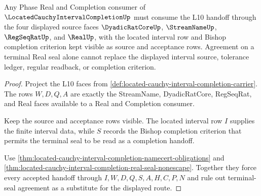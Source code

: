 \begin{theorem}
\label{thm:located-cauchy-interval-completion-l10-handoff}
Any Phase Real and Completion consumer of $\LocatedCauchyIntervalCompletionUp$ must consume the L10 handoff through the four displayed source faces $\DyadicRatCoreUp$, $\StreamNameUp$, $\RegSeqRatUp$, and $\RealUp$, with the located interval row and Bishop completion criterion kept visible as source and acceptance rows. Agreement on a terminal Real seal alone cannot replace the displayed interval source, tolerance ledger, regular readback, or completion criterion.
\end{theorem}
\begin{proof}
Project the L10 faces from \autoref{def:located-cauchy-interval-completion-carrier}. The rows $W,D,Q,A$ are exactly the StreamName, DyadicRatCore, RegSeqRat, and Real faces available to a Real and Completion consumer.

Keep the source and acceptance rows visible. The located interval row $I$ supplies the finite interval data, while $S$ records the Bishop completion criterion that permits the terminal seal to be read as a completion handoff.

Use \autoref{thm:located-cauchy-interval-completion-namecert-obligations} and \autoref{thm:located-cauchy-interval-completion-real-seal-nonescape}. Together they force every accepted handoff through $I,W,D,Q,S,A,H,C,P,N$ and rule out terminal-seal agreement as a substitute for the displayed route.
\end{proof}




